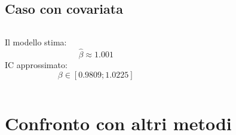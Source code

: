 \documentclass[landscape,9pt]{beamer}                           %
\begin{document}
\begin{frame}
\begin{columns}
\begin{column}{0.4\textwidth}
\begin{center}
		\end{center}
	\end{column}
\end{columns}
\end{frame}

\subsection{Caso con covariata}
\begin{frame}
\begin{columns}
	\begin{column}{0.25\textwidth}
	Il modello stima:
	$$
	\hat{\beta} \approx 1.001 
	$$
	IC approssimato:
	$$
	\beta \in [0.9809;1.0225]
	$$
	\end{column}
	\begin{column}{0.65\textwidth}	
		\begin{flushright}		
		\end{flushright}
	\end{column}
\end{columns}
\end{frame}


\section{Confronto con altri metodi}
\end{document}

